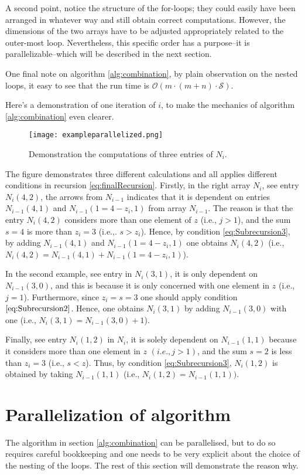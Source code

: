 \documentclass[a4paper,11pt]{article}
\begin{document}
A second point, notice the structure of the for-loops; they could easily have been arranged in whatever way and still obtain correct computations. However, the dimensions of the two arrays have to be adjusted appropriately related to the outer-most loop. Nevertheless, this specific order has a purpose–it is parallelizable–which will be described in the next section.

One final note on algorithm \ref{alg:combination}, by plain observation on the nested loops, it easy to see that the run time is $\mathcal{O}(m\cdot (m+n)\cdot \mathcal{S})$.

Here's a demonstration of one iteration of $i$, to make the mechanics of algorithm \ref{alg:combination} even clearer.

\begin{figure}[H]
\centering
\texttt{[image: exampleparallelized.png]}
\caption{Demonstration the computations of three entries of $N_{i}$.}\label{normal_calibration.png}
\end{figure}

The figure demonstrates three different calculations and all applies different conditions in recursion \ref{eq:finalRecursion}. Firstly, in the right array $N_{i}$, see entry $N_{i}(4,2)$, the arrows from $N_{i-1}$ indicates that it is dependent on entries $N_{i-1}(4,1)$ and $N_{i-1}(1=4-z_{i},1)$ from array $N_{i-1}$. The reason is that the entry $N_{i}(4,2)$ considers more than one element of $z$ (i.e., $j>1$), and the sum $s=4$ is more than $z_{i}=3$ (i.e.,. $s>z_{i}$). Hence, by condition \ref{eq:Subrecursion3}, by adding $N_{i-1}(4,1)$ and $N_{i-1}(1=4-z_{i},1)$ one obtains $N_{i}(4,2)$ (i.e., $N_{i}(4,2)=N_{i-1}(4,1) +N_{i-1}(1=4-z_{i},1)$).

In the second example, see entry  in $N_{i}(3,1)$, it is only dependent on $N_{i-1}(3,0)$, and this is because it is only concerned with one element in $z$ (i.e., $j=1$). Furthermore, since $z_{i}=s=3$ one should apply condition $\ref{eq:Subrecursion2}$. Hence, one obtains $N_{i}(3,1)$ by adding $N_{i-1}(3,0)$ with one (i.e., $N_{i}(3,1)=N_{i-1}(3,0)+1$).

Finally, see entry $N_{i}(1,2)$ in $N_{i}$, it is solely dependent on $N_{i-1}(1,1)$ because it considers more than one element in $z$ $(i.e., j>1)$, and the sum $s=2$ is less than $z_{i}=3$ (i.e., $s<z$). Thus, by condition \ref{eq:Subrecursion3},  $N_{i}(1,2)$ is obtained by taking $N_{i-1}(1,1)$ (i.e., $N_{i}(1,2)=N_{i-1}(1,1)).$

\section{Parallelization of algorithm}
\label{sec:paraAlgo}
The algorithm in section \ref{alg:combination} can be parallelised, but to do so requires careful bookkeeping and one needs to be very explicit about the choice of the nesting of the loops. The rest of this section will demonstrate the reason why.
\end{document}
